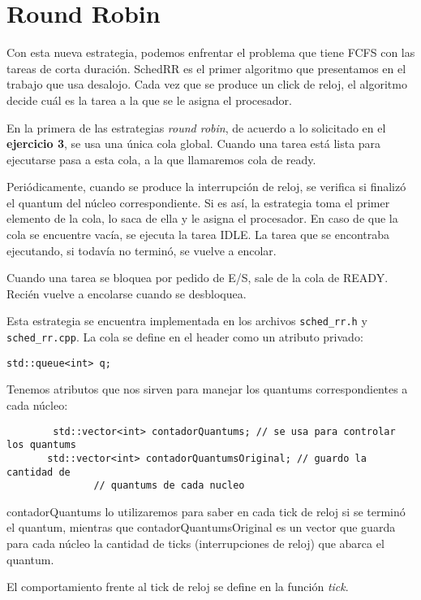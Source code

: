 \section{Round Robin}

Con esta nueva estrategia, podemos enfrentar el problema que tiene FCFS con las tareas de corta duraci\'on. SchedRR es el primer algoritmo que presentamos en el trabajo que usa desalojo. Cada vez que se produce un click de reloj, el algoritmo decide cu\'al es la tarea a la que se le asigna el procesador.

En la primera de las estrategias \textit{round robin}, de acuerdo a lo solicitado en el \textbf{ejercicio 3}, se usa una \'unica cola global. Cuando una tarea est\'a lista para ejecutarse pasa a esta cola, a la que llamaremos cola de ready. 

Peri\'odicamente, cuando se produce la interrupci\'on de reloj, se verifica si finaliz\'o el quantum del n\'ucleo correspondiente. Si es as\'i, la estrategia toma el primer elemento de la cola, lo saca de ella y le asigna el procesador. En caso de que la cola se encuentre vac\'ia, se ejecuta la tarea IDLE. La tarea que se encontraba ejecutando, si todav\'ia no termin\'o, se vuelve a encolar.

Cuando una tarea se bloquea por pedido de E/S, sale de la cola de READY. Reci\'en vuelve a encolarse cuando se desbloquea.

Esta estrategia se encuentra implementada en los archivos \verb+sched_rr.h+ y \verb+sched_rr.cpp+. La cola se define en el header como un atributo privado:

\begin{verbatim} 
std::queue<int> q;
\end{verbatim}

Tenemos atributos que nos sirven para manejar los quantums correspondientes a cada n\'ucleo:

\begin{verbatim}
        std::vector<int> contadorQuantums; // se usa para controlar los quantums
       std::vector<int> contadorQuantumsOriginal; // guardo la cantidad de 
               // quantums de cada nucleo
\end{verbatim}

contadorQuantums lo utilizaremos para saber en cada tick de reloj si se termin\'o el quantum, mientras que contadorQuantumsOriginal es un vector que guarda para cada n\'ucleo la cantidad de ticks (interrupciones de reloj) que abarca el quantum. 

El comportamiento frente al tick de reloj se define en la funci\'on \textit{tick}.

